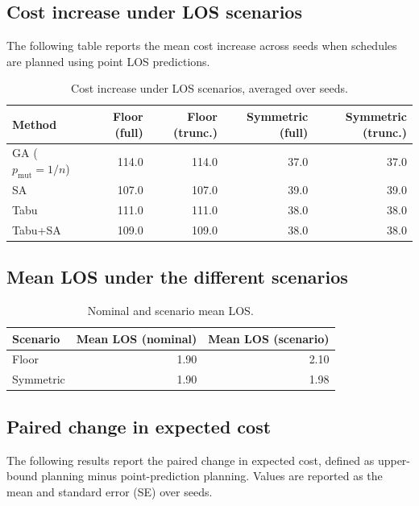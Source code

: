 \documentclass[11pt,a4paper]{article}
\begin{document}
\subsection{Cost increase under LOS scenarios}

The following table reports the mean cost increase across seeds
when schedules are planned using point LOS predictions.

\begin{table}[htbp]
\centering
\caption{Cost increase under LOS scenarios, averaged over seeds.}
\label{tab:terminal-cost-increase}
\small
\begin{tabular}{lrrrr}
\hline
Method & Floor (full) & Floor (trunc.)
       & Symmetric (full) & Symmetric (trunc.) \\
\hline
GA ($p_{\mathrm{mut}}=1/n$) & 114.0 & 114.0 & 37.0 & 37.0 \\
SA                       & 107.0 & 107.0 & 39.0 & 39.0 \\
Tabu                     & 111.0 & 111.0 & 38.0 & 38.0 \\
Tabu+SA                  & 109.0 & 109.0 & 38.0 & 38.0 \\
\hline
\end{tabular}
\end{table}

\subsection{Mean LOS under the different scenarios}

\begin{table}[htbp]
\centering
\caption{Nominal and scenario mean LOS.}
\label{tab:terminal-mean-los}
\small
\begin{tabular}{lrr}
\hline
Scenario & Mean LOS (nominal) & Mean LOS (scenario) \\
\hline
Floor      & 1.90 & 2.10 \\
Symmetric  & 1.90 & 1.98 \\
\hline
\end{tabular}
\end{table}

\subsection{Paired change in expected cost}

The following results report the paired change in expected cost,
defined as upper-bound planning minus point-prediction planning.
Values are reported as the mean and standard error (SE) over seeds.
\end{document}
